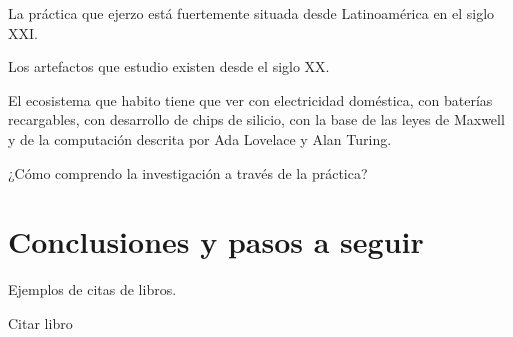 \documentclass{article}
\begin{document}
La práctica que ejerzo está fuertemente situada desde Latinoamérica en el siglo XXI.

Los artefactos que estudio existen desde el siglo XX.

El ecosistema que habito tiene que ver con electricidad doméstica, con baterías recargables, con desarrollo de chips de silicio, con la base de las leyes de Maxwell y de la computación descrita por Ada Lovelace y Alan Turing.


¿Cómo comprendo la investigación a través de la práctica?


\section{Conclusiones y pasos a seguir}

Ejemplos de citas de libros.

Citar libro \cite{korgBerlin}


\printbibliography[title={Bibliografía}, heading=bibintoc]
\end{document}
